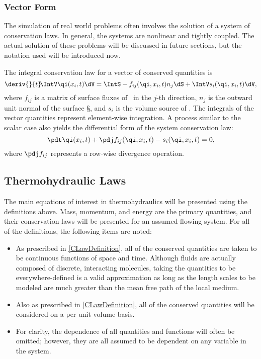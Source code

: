 \subsubsection{Vector Form}
The simulation of real world problems often involves the solution of a system of conservation laws.
In general, the systems are nonlinear and tightly coupled.
The actual solution of these problems will be discussed in future sections, but the notation used will be introduced now.

The integral conservation law for a vector of conserved quantities \qi{} is
\begin{equation}%
    \deriv{}{t}\!\IntV \qi(x_i,t) \dV = \IntS -f_{ij}(\qi,x_i,t) n_j\dS + \IntV s_i(\qi,x_i,t) \dV,
    \label{Eqn:GeneralIntegralCLawForSystems}
\end{equation}
where $f_{ij}$ is a matrix of surface fluxes of \qi\ in the $j$-th direction, $n_j$ is the outward unit normal of the surface \S, and $s_i$ is the volume source of \qi.
The integrals of the vector quantities represent element-wise integration.
A process similar to the scalar case also yields the differential form of the system conservation law:
\begin{equation}
    \pdt\qi(x_i,t) + \pdj f_{ij}(\qi,x_i,t) -s_i(\qi,x_i,t)  = 0,
    \label{Eqn:PreLimitGeneralIntegralCLawForSystems}
\end{equation}
where $\pdj f_{ij}$ represents a row-wise divergence operation.






\subsection{Thermohydraulic Laws}

The main equations of interest in thermohydraulics will be presented using the definitions above.
Mass, momentum, and energy are the primary quantities, and their conservation laws will be presented for an assumed-flowing system.
For all of the definitions, the following items are noted:
\begin{itemize}
    \item{
        As prescribed in \cref{CLawDefinition}, all of the conserved quantities are taken to be continuous functions of space and time.
        Although fluids are actually composed of discrete, interacting molecules, taking the quantities to be everywhere-defined is a valid approximation as long as the length scales to be modeled are much greater than the mean free path of the local medium.
        \cite{currie_fundamental_2012}
    }
    \item{
        Also as prescribed in \cref{CLawDefinition}, all of the conserved quantities will be considered on a per unit volume basis.
    }
    \item{
        For clarity, the dependence of all quantities and functions will often be omitted; however, they are all assumed to be dependent on any variable in the system.
    }
\end{itemize}


